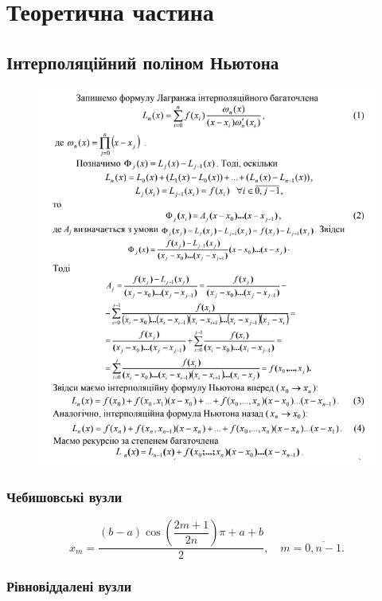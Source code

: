 \documentclass[12pt, a4paper]{article}
\theoremstyle{definition}
\numberwithin{equation}{section}
\begin{document}
\section{Теоретична частина}

\subsection{Інтерполяційний поліном Ньютона}

\begin{figure}[H]
	\centering
	\includegraphics[width=\linewidth]{newton.png}
\end{figure}

\subsubsection{Чебишовські вузли}

\[ x_m = \dfrac{(b-a)\cos\left(\dfrac{2m+1}{2n}\right)\pi+a+b}{2}, \quad m=\overline{0,n-1}.\]
 
\subsubsection{Рівновіддалені вузли}
\end{document}

